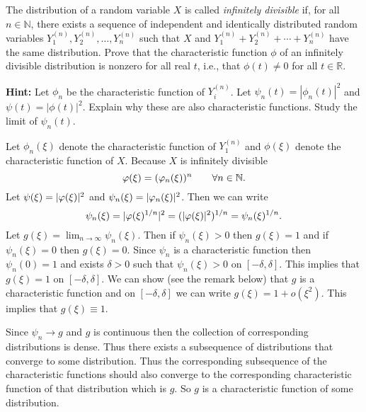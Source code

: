 \begin{problem}
	The distribution of a random variable \( X \) is called \textit{infinitely divisible} if, for all \( n \in \mathbb{N} \), there exists a sequence of independent and identically distributed random variables \( Y_1^{(n)}, Y_2^{(n)}, \ldots, Y_n^{(n)} \) such that \( X \) and \( Y_1^{(n)} + Y_2^{(n)} + \cdots + Y_n^{(n)} \) have the same distribution. Prove that the characteristic function \( \phi \) of an infinitely divisible distribution is nonzero for all real \( t \), i.e., that \( \phi(t) \neq 0 \) for all \( t \in \mathbb{R} \).
	
	\smallskip
	\noindent
	\textbf{Hint:} Let \( \phi_n \) be the characteristic function of \( Y_i^{(n)} \). Let \( \psi_n(t) = |\phi_n(t)|^2 \) and \( \psi(t) = |\phi(t)|^2 \). Explain why these are also characteristic functions. Study the limit of \( \psi_n(t) \).
\end{problem}
\begin{solution}
	Let $ \phi_n(\xi) $ denote the characteristic function of $ Y^{(n)}_1 $ and $ \phi(\xi) $ denote the characteristic function of $ X $. Because $ X $ is infinitely divisible
	\[ \varphi(\xi) = (\varphi_n(\xi))^n \qquad \forall  n\in \mathbb{N} . \]
	Let $ \psi(\xi) = |\varphi(\xi)|^2 $ and $ \psi_n(\xi) = |\varphi_n(\xi)|^2 $. Then we can write
	\[ \psi_n(\xi) = |\varphi(\xi)^{1/n}|^2 = (|\varphi(\xi)|^2)^{1/n} = \psi_n(\xi)^{1/n}.  \]
	Let $ g(\xi) = \lim_{n\to\infty}\psi_n(\xi) $. Then if $ \psi_n(\xi) >0 $ then $ g(\xi) = 1 $ and if $ \psi_n(\xi) = 0 $ then $ g(\xi) = 0 $. Since $ \psi_n $ is a characteristic function then $ \psi_n(0) =1 $ and exists $ \delta > 0 $ such that $ \psi_n(\xi) > 0 $ on $ [-\delta, \delta] $. This implies that $ g(\xi) = 1 $ on $ [-\delta, \delta] $. We can show (see the remark below) that $ g $ is a characteristic function and on $ [-\delta, \delta] $ we can write $ g(\xi) = 1 + o(\xi^2) $. This implies that $ g(\xi) \equiv 1 $.
\end{solution}
\begin{remark}
	Since $ \psi_n \to g $ and $ g $ is continuous then the collection of corresponding distributions is dense. Thus there exists a subsequence of distributions that converge to some distribution. Thus the corresponding subsequence of the characteristic functions should also converge to the corresponding characteristic function of that distribution which is $ g $. So $ g $ is a characteristic function of some distribution.
\end{remark}

